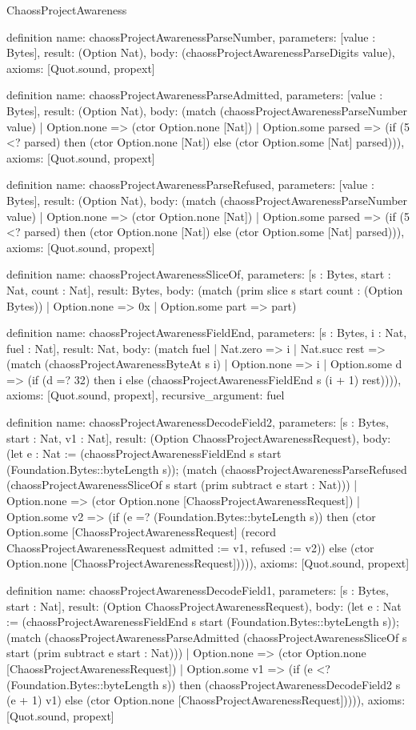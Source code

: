 \begin{lexlean}{ChaossProjectAwareness}
\begin{semanticmodule}
definition{
  name: chaossProjectAwarenessParseNumber,
  parameters: [value : Bytes],
  result: (Option Nat),
  body: (chaossProjectAwarenessParseDigits value),
  axioms: [Quot.sound, propext]
}

definition{
  name: chaossProjectAwarenessParseAdmitted,
  parameters: [value : Bytes],
  result: (Option Nat),
  body: (match (chaossProjectAwarenessParseNumber value)
    | Option.none => (ctor Option.none [Nat])
    | Option.some parsed => (if (5 <? parsed) then (ctor Option.none [Nat]) else (ctor Option.some [Nat] parsed))),
  axioms: [Quot.sound, propext]
}

definition{
  name: chaossProjectAwarenessParseRefused,
  parameters: [value : Bytes],
  result: (Option Nat),
  body: (match (chaossProjectAwarenessParseNumber value)
    | Option.none => (ctor Option.none [Nat])
    | Option.some parsed => (if (5 <? parsed) then (ctor Option.none [Nat]) else (ctor Option.some [Nat] parsed))),
  axioms: [Quot.sound, propext]
}

definition{
  name: chaossProjectAwarenessSliceOf,
  parameters: [s : Bytes, start : Nat, count : Nat],
  result: Bytes,
  body: (match (prim slice s start count : (Option Bytes))
    | Option.none => 0x
    | Option.some part => part)
}

definition{
  name: chaossProjectAwarenessFieldEnd,
  parameters: [s : Bytes, i : Nat, fuel : Nat],
  result: Nat,
  body: (match fuel
    | Nat.zero => i
    | Nat.succ rest => (match (chaossProjectAwarenessByteAt s i)
      | Option.none => i
      | Option.some d => (if (d =? 32) then i else (chaossProjectAwarenessFieldEnd s (i + 1) rest)))),
  axioms: [Quot.sound, propext],
  recursive_argument: fuel
}

definition{
  name: chaossProjectAwarenessDecodeField2,
  parameters: [s : Bytes, start : Nat, v1 : Nat],
  result: (Option ChaossProjectAwarenessRequest),
  body: (let e : Nat := (chaossProjectAwarenessFieldEnd s start (Foundation.Bytes::byteLength s)); (match (chaossProjectAwarenessParseRefused (chaossProjectAwarenessSliceOf s start (prim subtract e start : Nat)))
    | Option.none => (ctor Option.none [ChaossProjectAwarenessRequest])
    | Option.some v2 => (if (e =? (Foundation.Bytes::byteLength s)) then (ctor Option.some [ChaossProjectAwarenessRequest] (record ChaossProjectAwarenessRequest {admitted := v1, refused := v2})) else (ctor Option.none [ChaossProjectAwarenessRequest])))),
  axioms: [Quot.sound, propext]
}

definition{
  name: chaossProjectAwarenessDecodeField1,
  parameters: [s : Bytes, start : Nat],
  result: (Option ChaossProjectAwarenessRequest),
  body: (let e : Nat := (chaossProjectAwarenessFieldEnd s start (Foundation.Bytes::byteLength s)); (match (chaossProjectAwarenessParseAdmitted (chaossProjectAwarenessSliceOf s start (prim subtract e start : Nat)))
    | Option.none => (ctor Option.none [ChaossProjectAwarenessRequest])
    | Option.some v1 => (if (e <? (Foundation.Bytes::byteLength s)) then (chaossProjectAwarenessDecodeField2 s (e + 1) v1) else (ctor Option.none [ChaossProjectAwarenessRequest])))),
  axioms: [Quot.sound, propext]
}


\end{semanticmodule}
\end{lexlean}
